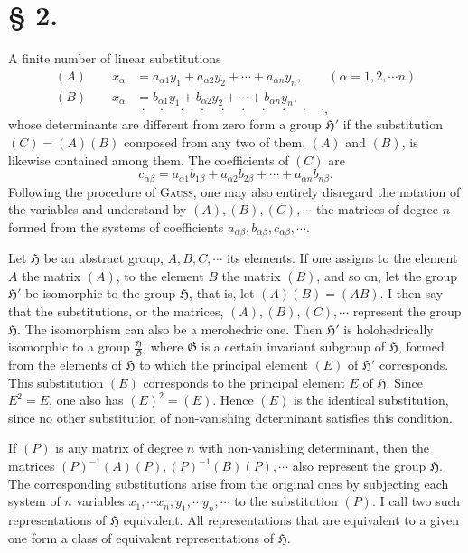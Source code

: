 \documentclass[11pt]{article}
\newcommand{\Hgrp}{\mathfrak{H}}
\newcommand{\Ggrp}{\mathfrak{G}}
\begin{document}
\section*{§ 2.}

A finite number of linear substitutions
\begin{align*}
(A)\qquad x_\alpha&=a_{\alpha1}y_1+a_{\alpha2}y_2+\cdots+a_{\alpha n}y_n,\qquad (\alpha=1,2,\cdots n)\\
(B)\qquad x_\alpha&=b_{\alpha1}y_1+b_{\alpha2}y_2+\cdots+b_{\alpha n}y_n,
\end{align*}
\[
\cdot\quad\cdot\quad\cdot\quad\cdot\quad\cdot\quad\cdot\quad\cdot\quad\cdot\quad\cdot\quad\cdot,
\]
whose determinants are different from zero form a group $\Hgrp'$ if the substitution $(C)=(A)(B)$ composed from any two of them, $(A)$ and $(B)$, is likewise contained among them. The coefficients of $(C)$ are
\[
c_{\alpha\beta}=a_{\alpha1}b_{1\beta}+a_{\alpha2}b_{2\beta}+\cdots+a_{\alpha n}b_{n\beta}.
\]
Following the procedure of \textsc{Gauss}, one may also entirely disregard the notation of the variables and understand by $(A),(B),(C),\cdots$ the matrices of degree $n$ formed from the systems of coefficients $a_{\alpha\beta},b_{\alpha\beta},c_{\alpha\beta},\cdots$.

Let $\Hgrp$ be an abstract group, $A,B,C,\cdots$ its elements. If one assigns to the element $A$ the matrix $(A)$, to the element $B$ the matrix $(B)$, and so on, let the group $\Hgrp'$ be isomorphic to the group $\Hgrp$, that is, let $(A)(B)=(AB)$. I then say that the substitutions, or the matrices, $(A),(B),(C),\cdots$ represent the group $\Hgrp$. The isomorphism can also be a merohedric one. Then $\Hgrp'$ is holohedrically isomorphic to a group $\frac{\Hgrp}{\Ggrp}$, where $\Ggrp$ is a certain invariant subgroup of $\Hgrp$, formed from the elements of $\Hgrp$ to which the principal element $(E)$ of $\Hgrp'$ corresponds. This substitution $(E)$ corresponds to the principal element $E$ of $\Hgrp$. Since $E^2=E$, one also has $(E)^2=(E)$. Hence $(E)$ is the identical substitution, since no other substitution of non-vanishing determinant satisfies this condition.

If $(P)$ is any matrix of degree $n$ with non-vanishing determinant, then the matrices $(P)^{-1}(A)(P),(P)^{-1}(B)(P),\cdots$ also represent the group $\Hgrp$. The corresponding substitutions arise from the original ones by subjecting each system of $n$ variables $x_1,\cdots x_n;y_1,\cdots y_n;\cdots$ to the substitution $(P)$. I call two such representations of $\Hgrp$ equivalent. All representations that are equivalent to a given one form a class of equivalent representations of $\Hgrp$.
\end{document}
